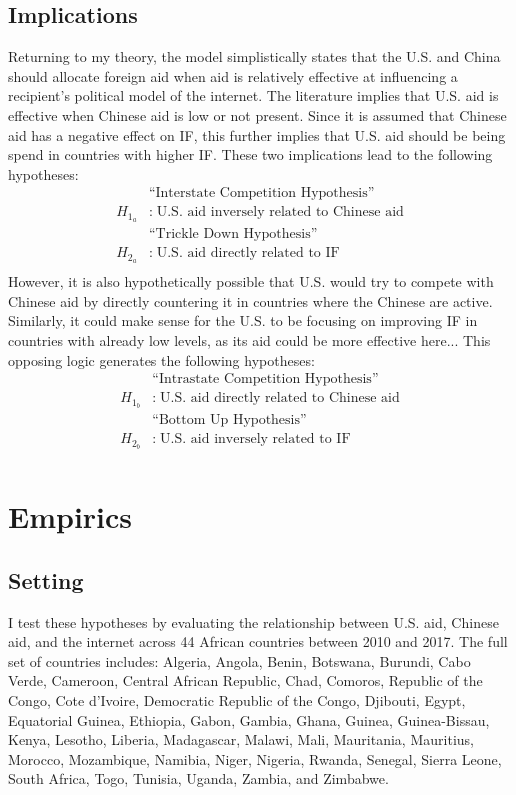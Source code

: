 \documentclass[12pt]{article}
\begin{document}
\subsection*{Implications}
Returning to my theory, the model simplistically states that the U.S. and China should allocate foreign aid when aid is relatively effective at influencing a recipient's political model of the internet. The literature implies that U.S. aid is effective when Chinese aid is low or not present. Since it is assumed that Chinese aid has a negative effect on IF, this further implies that U.S. aid should be being spend in countries with higher IF. These two implications lead to the following hypotheses:
\begin{align*}
    &\text{``Interstate Competition Hypothesis''}\\
    H_{1_a}&:\;\text{U.S. aid inversely related to Chinese aid}\\
    &\text{``Trickle Down Hypothesis''}\\
    H_{2_a}&:\;\text{U.S. aid directly related to IF}\\
\end{align*}
However, it is also hypothetically possible that U.S. would try to compete with Chinese aid by directly countering it in countries where the Chinese are active. Similarly, it could make sense for the U.S. to be focusing on improving IF in countries with already low levels, as its aid could be more effective here... This opposing logic generates the following hypotheses:
\begin{align*}
    &\text{``Intrastate Competition Hypothesis''}\\
    H_{1_b}&:\;\text{U.S. aid directly related to Chinese aid}\\
    &\text{``Bottom Up Hypothesis''}\\
    H_{2_b}&:\;\text{U.S. aid inversely related to IF}\\
\end{align*}

\section*{Empirics}
\subsection*{Setting}
I test these hypotheses by evaluating the relationship between U.S. aid, Chinese aid, and the internet across 44 African countries between 2010 and 2017. The full set of countries includes: Algeria, Angola, Benin, Botswana, Burundi, Cabo Verde, Cameroon, Central African Republic, Chad, Comoros, Republic of the Congo, Cote d'Ivoire, Democratic Republic of the Congo, Djibouti, Egypt, Equatorial Guinea, Ethiopia, Gabon, Gambia, Ghana, Guinea, Guinea-Bissau, Kenya, Lesotho, Liberia, Madagascar, Malawi, Mali, Mauritania, Mauritius, Morocco, Mozambique, Namibia, Niger, Nigeria, Rwanda, Senegal, Sierra Leone, South Africa, Togo, Tunisia, Uganda, Zambia, and Zimbabwe. 
\end{document}
